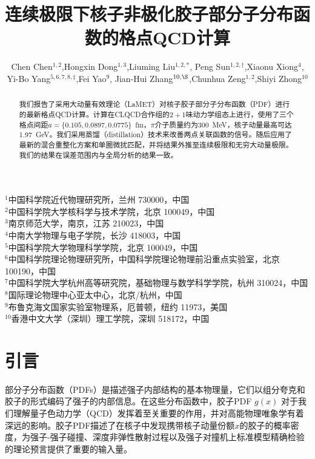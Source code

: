 \documentclass[12pt,a4paper]{ctexart}
\title{\heiti 连续极限下核子非极化胶子部分子分布函数的格点QCD计算}
\author{
    Chen Chen$^{1,2}$,\quad Hongxin Dong$^{1,3}$,\quad Liuming Liu$^{1,2,*}$,\quad
    Peng Sun$^{1,2,\dagger}$,\quad Xiaonu Xiong$^{4}$,\\[3pt]
    Yi-Bo Yang$^{5,6,7,8,\ddagger}$,\quad Fei Yao$^{9}$,\quad
    Jian-Hui Zhang$^{10,\S}$,\quad Chunhua Zeng$^{1,2}$,\quad Shiyi Zhong$^{10}$
}
\date{}
\begin{document}
\maketitle

\begin{center}
\small
$^{1}$中国科学院近代物理研究所，兰州 730000，中国\\
$^{2}$中国科学院大学核科学与技术学院，北京 100049，中国\\
$^{3}$南京师范大学，南京，江苏 210023，中国\\
$^{4}$中南大学物理与电子学院，长沙 418003，中国\\
$^{5}$中国科学院大学物理科学学院，北京 100049，中国\\
$^{6}$中国科学院理论物理研究所，中国科学院理论物理前沿重点实验室，北京 100190，中国\\
$^{7}$中国科学院大学杭州高等研究院，基础物理与数学科学学院，杭州 310024，中国\\
$^{8}$国际理论物理中心亚太中心，北京/杭州，中国\\
$^{9}$布鲁克海文国家实验室物理系，厄普顿，纽约 11973，美国\\
$^{10}$香港中文大学（深圳）理工学院，深圳 518172，中国
\end{center}

\vspace{5pt}

\begin{abstract}
\noindent
我们报告了采用大动量有效理论（LaMET）对核子胶子部分子分布函数（PDF）进行的最新格点QCD计算。计算在CLQCD合作组的$2+1$味动力学组态上进行，使用了三个格点间距$a = \{0.105, 0.0897, 0.0775\}$~fm，$\pi$介子质量约为300~MeV，核子动量最高可达1.97~GeV。我们采用蒸馏（distillation）技术来改善两点关联函数的信号。随后应用了最新的混合重整化方案和单圈微扰匹配，并将结果外推至连续极限和无穷大动量极限。我们的结果在误差范围内与全局分析的结果一致。
\end{abstract}

\section{引言}

部分子分布函数（PDFs）是描述强子内部结构的基本物理量，它们以组分夸克和胶子的形式编码了强子的内部信息。在这些分布函数中，胶子PDF $g(x)$ 对于我们理解量子色动力学（QCD）发挥着至关重要的作用，并对高能物理唯象学有着深远的影响。胶子PDF描述了在核子中发现携带核子动量份额$x$的胶子的概率密度，为强子-强子碰撞、深度非弹性散射过程以及强子对撞机上标准模型精确检验的理论预言提供了重要的输入量。
\end{document}

